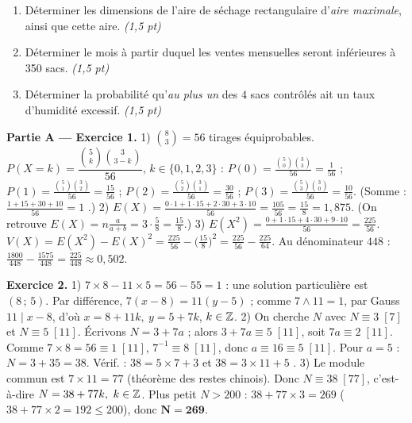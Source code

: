 \begin{enumerate}[label=\textbf{Tâche \arabic*.},leftmargin=2.4em]
\item Déterminer les dimensions de l'aire de séchage rectangulaire d'\emph{aire maximale}, ainsi que cette aire. \hfill\textit{(1,5 pt)}
\item Déterminer le mois à partir duquel les ventes mensuelles seront inférieures à \SI{350}{} sacs. \hfill\textit{(1,5 pt)}
\item Déterminer la probabilité qu'\emph{au plus un} des $4$ sacs contrôlés ait un taux d'humidité excessif. \hfill\textit{(1,5 pt)}
\end{enumerate}
\par{}


\noindent\textbf{Partie A — Exercice 1.}
1) $\binom83=56$ tirages équiprobables. $P(X{=}k)=\dfrac{\binom5k\binom3{3-k}}{56}$, $k\in\{0,1,2,3\}$ :
$P(0)=\frac{\binom50\binom33}{56}=\frac1{56}$ ; $P(1)=\frac{\binom51\binom32}{56}=\frac{15}{56}$ ;
$P(2)=\frac{\binom52\binom31}{56}=\frac{30}{56}$ ; $P(3)=\frac{\binom53\binom30}{56}=\frac{10}{56}$.
(Somme : $\frac{1+15+30+10}{56}=1$ \checkmark.)
2) $E(X)=\frac{0\cdot1+1\cdot15+2\cdot30+3\cdot10}{56}=\frac{105}{56}=\frac{15}{8}=1{,}875$.
(On retrouve $E(X)=n\frac{a}{a+b}=3\cdot\frac58=\frac{15}{8}$.)
3) $E(X^2)=\frac{0+1\cdot15+4\cdot30+9\cdot10}{56}=\frac{225}{56}$.
$V(X)=E(X^2)-E(X)^2=\frac{225}{56}-\big(\frac{15}{8}\big)^2=\frac{225}{56}-\frac{225}{64}$.
Au dénominateur $448$ : $\frac{1800}{448}-\frac{1575}{448}=\frac{225}{448}\approx0{,}502$.

\noindent\textbf{Exercice 2.}
1) $7\times8-11\times5=56-55=1$ : une solution particulière est $(8\,;\,5)$. Par différence,
$7(x-8)=11(y-5)$ ; comme $7\wedge11=1$, par Gauss $11\mid x-8$, d'où $x=8+11k,\ y=5+7k$, $k\in\mathbb{Z}$.
2) On cherche $N$ avec $N\equiv3\;[7]$ et $N\equiv5\;[11]$. Écrivons $N=3+7a$ ; alors $3+7a\equiv5\;[11]$,
soit $7a\equiv2\;[11]$. Comme $7\times8=56\equiv1\;[11]$, $7^{-1}\equiv8\;[11]$, donc $a\equiv16\equiv5\;[11]$.
Pour $a=5$ : $N=3+35=38$. Vérif. : $38=5\times7+3$ et $38=3\times11+5$ \checkmark.
3) Le module commun est $7\times11=77$ (théorème des restes chinois). Donc $N\equiv38\;[77]$,
c'est-à-dire $N=38+77k,\ k\in\mathbb{Z}$. Plus petit $N>200$ : $38+77\times3=269$ ($38+77\times2=192\le200$), donc $\mathbf{N=269}$.

